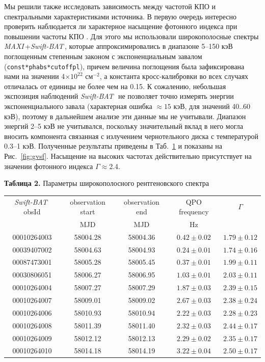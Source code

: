 \documentclass{pazhb}
\def\maxi{{\em MAXI}}
\def\swiftb{{\em Swift-BAT\,}}
\begin{document}
Мы решили также исследовать зависимость между частотой КПО и спектральными характеристиками источника. В первую очередь интересно проверить наблюдается ли характерное насыщение фотонного индекса при повышении частоты КПО \citep[см. например ][]{sobczak00,vignarca03}. Для этого мы использовали широкополосные спектры \maxi\,+\swiftb, которые аппроксимировались в диапазоне 5--150 кэВ поглощенным степенным законом с экспоненциальным завалом (\texttt{const*phabs*cutoffpl}), причем величина поглощения была зафиксирована нами на значении 4$\times10^{22}$ см$^{-2}$, а константа кросс-калибровки во всех случаях отличалась от единицы не более чем на 0.15. К сожалению, небольшая экспозиция наблюдений \swiftb\, не позволяет точно измерять энергии экспоненциального завала (характерная ошибка $\approx15$ кэВ, для значений 40..60 кэВ), поэтому в дальнейшем анализе эти данные мы не учитывали. Диапазон энергий 2--5 кэВ не учитывался, поскольку значительный вклад в него могла вносить компонента связанная с излучением чернотельного диска с температурой 0.3--1 кэВ.
 Полученные результаты приведены в Таб.~\ref{tab:gvsf} и показаны на Рис.~\ref{fig:gvsf}. Насыщение на высоких частотах действительно присутствует на значении фотонного индекса  $\Gamma\approx$2.4.

\begin{table}[t]

\vspace{6mm}
\centering
{{\bf Таблица 2.} Параметры широкополосного рентгеновского спектра\protect\\}

\vspace{5mm}\begin{tabular}{c|c|c|c|c} \hline\hline
\swiftb\,obsId & observation start & observation end &  QPO frequency &$\Gamma$\\
                        &        MJD              & MJD                    & Hz                      &\\ 
\hline
00010264003 &58004.28&58004.36  &$0.42\pm 0.02 $ & $1.79\pm0.12$\\
00039407002 &58004.63&58004.93  &$0.24\pm 0.01 $ & $1.74\pm0.16$\\
00087473001 &58005.28&58005.45  &$0.37\pm 0.01 $ & $1.99\pm0.11$\\
00030806051 &58006.27&58006.95&$1.03\pm 0.01 $ & $2.03\pm0.11$\\ 
00010264004 &58007.27&58007.29&  $1.87\pm 0.03 $ & $2.39\pm 0.15 $\\
00010264007 &58009.01&58009.02&  $2.67\pm 0.03 $ & $2.38\pm 0.24 $\\
00010264006 &58010.93&58010.94&  $2.22\pm 0.03 $  & $2.28\pm 0.23 $\\
00010264008 &58011.39&58011.40&  $2.32\pm 0.03 $ & $2.44\pm 0.17 $\\
00010264009 &58012.12&58012.13&  $2.29\pm 0.02 $& $2.35\pm 0.17 $\\
00010264010 &58014.18&58014.19&  $3.22\pm 0.04 $ & $2.50\pm 0.17 $\\
\hline
\end{tabular}
\label{tab:gvsf}
\end{table}
\end{document}
